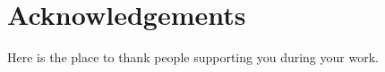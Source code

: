 \markboth{}{}
\chapter*{Acknowledgements}
\label{ch:acknowledge}

Here is the place to thank people supporting you during your work.